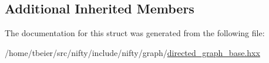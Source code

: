 \subsection*{Additional Inherited Members}


The documentation for this struct was generated from the following file\+:\begin{DoxyCompactItemize}
\item 
/home/tbeier/src/nifty/include/nifty/graph/\hyperlink{directed__graph__base_8hxx}{directed\+\_\+graph\+\_\+base.\+hxx}\end{DoxyCompactItemize}
